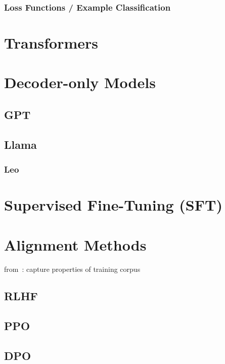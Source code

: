 




\subsubsection{Loss Functions / Example Classification}


\section{Transformers}\label{sec:trans}


\section{Decoder-only Models}\label{sec:decoder}

\subsection{GPT}\label{subsec:gpt}

\subsection{Llama}\label{subsec:llama}

\subsubsection{Leo}


\section{Supervised Fine-Tuning (SFT)}\label{sec:supervised-fine-tuning}


\section{Alignment Methods}\label{sec:alignment-methods}
from~\autocite{zhao2023survey}:
capture properties of training corpus

\subsection{RLHF}\label{subsec:rlhf}

\subsection{PPO}\label{subsec:ppo}

\subsection{DPO}\label{subsec:dpo}
